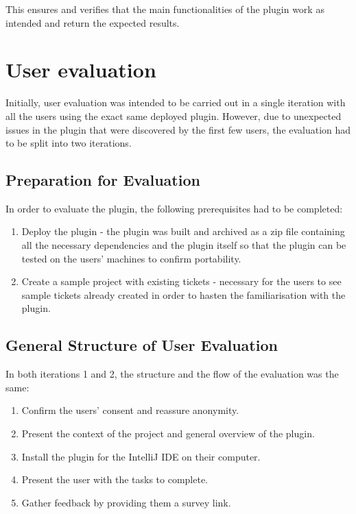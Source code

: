 \documentclass{4thYearProject}
\begin{document}
This ensures and verifies that the main functionalities of the plugin work as intended and return the expected results.  

\section{User evaluation}\label{sec:usereval}

Initially, user evaluation was intended to be carried out in a single iteration with all the users using the exact same deployed plugin. However, due to unexpected issues in the plugin that were discovered by the first few users, the evaluation had to be split into two iterations. 

\subsection{Preparation for Evaluation}

In order to evaluate the plugin, the following prerequisites had to be completed:

\begin{enumerate}
\item Deploy the plugin - the plugin was built and archived as a zip file containing all the necessary dependencies and the plugin itself so that the plugin can be tested on the users' machines to confirm portability. 
\item Create a sample project with existing tickets - necessary for the users to see sample tickets already created in order to hasten the familiarisation with the plugin.
\end{enumerate}


\subsection{General Structure of User Evaluation}

In both iterations 1 and 2, the structure and the flow of the evaluation was the same:

\begin{enumerate}
\item Confirm the users' consent and reassure anonymity.
\item Present the context of the project and general overview of the plugin.
\item Install the plugin for the IntelliJ IDE on their computer.
\item Present the user with the tasks to complete.
\item Gather feedback by providing them a survey link.
\end{enumerate}
\end{document}

